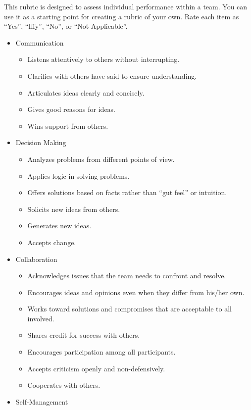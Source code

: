 This rubric is designed to assess individual performance within a
team. You can use it as a starting point for creating a rubric of
your own. Rate each item as ``Yes'', ``Iffy'', ``No'', or ``Not Applicable''.

\begin{itemize}
\tightlist
\item
  Communication

  \begin{itemize}
  \tightlist
  \item
    Listens attentively to others without interrupting.
  \item
    Clarifies with others have said to ensure understanding.
  \item
    Articulates ideas clearly and concisely.
  \item
    Gives good reasons for ideas.
  \item
    Wins support from others.
  \end{itemize}
\item
  Decision Making

  \begin{itemize}
  \tightlist
  \item
    Analyzes problems from different points of view.
  \item
    Applies logic in solving problems.
  \item
    Offers solutions based on facts rather than ``gut feel'' or intuition.
  \item
    Solicits new ideas from others.
  \item
    Generates new ideas.
  \item
    Accepts change.
  \end{itemize}
\item
  Collaboration

  \begin{itemize}
  \tightlist
  \item
    Acknowledges issues that the team needs to confront and resolve.
  \item
    Encourages ideas and opinions even when they differ from his/her own.
  \item
    Works toward solutions and compromises that are acceptable to all involved.
  \item
    Shares credit for success with others.
  \item
    Encourages participation among all participants.
  \item
    Accepts criticism openly and non-defensively.
  \item
    Cooperates with others.
  \end{itemize}
\item
  Self-Management


\end{itemize}
